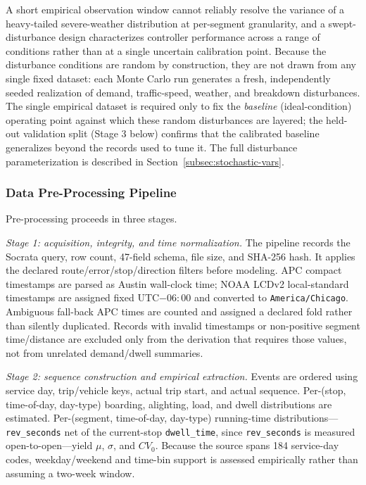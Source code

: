 A short empirical observation window cannot reliably resolve the variance of a heavy-tailed severe-weather distribution at per-segment granularity, and a swept-disturbance design characterizes controller performance across a range of conditions rather than at a single uncertain calibration point. Because the disturbance conditions are random by construction, they are not drawn from any single fixed dataset: each Monte Carlo run generates a fresh, independently seeded realization of demand, traffic-speed, weather, and breakdown disturbances. The single empirical dataset is required only to fix the \textit{baseline} (ideal-condition) operating point against which these random disturbances are layered; the held-out validation split (Stage 3 below) confirms that the calibrated baseline generalizes beyond the records used to tune it. The full disturbance parameterization is described in Section~\ref{subsec:stochastic-vars}.

\fi
\subsubsection{Data Pre-Processing Pipeline}
\label{subsec:data-pipeline}

Pre-processing proceeds in three stages.

\textit{Stage 1: acquisition, integrity, and time normalization.} The pipeline records the Socrata query, row count, 47-field schema, file size, and SHA-256 hash. It applies the declared route/error/stop/direction filters before modeling. APC compact timestamps are parsed as Austin wall-clock time; NOAA LCDv2 local-standard timestamps are assigned fixed UTC$-06{:}00$ and converted to \texttt{America/Chicago}. Ambiguous fall-back APC times are counted and assigned a declared fold rather than silently duplicated. Records with invalid timestamps or non-positive segment time/distance are excluded only from the derivation that requires those values, not from unrelated demand/dwell summaries.

\textit{Stage 2: sequence construction and empirical extraction.} Events are ordered using service day, trip/vehicle keys, actual trip start, and actual sequence. Per-(stop, time-of-day, day-type) boarding, alighting, load, and dwell distributions are estimated. Per-(segment, time-of-day, day-type) running-time distributions---\texttt{rev\_seconds} net of the current-stop \texttt{dwell\_time}, since \texttt{rev\_seconds} is measured open-to-open---yield $\mu$, $\sigma$, and $CV_0$. Because the source spans 184 service-day codes, weekday/weekend and time-bin support is assessed empirically rather than assuming a two-week window.

